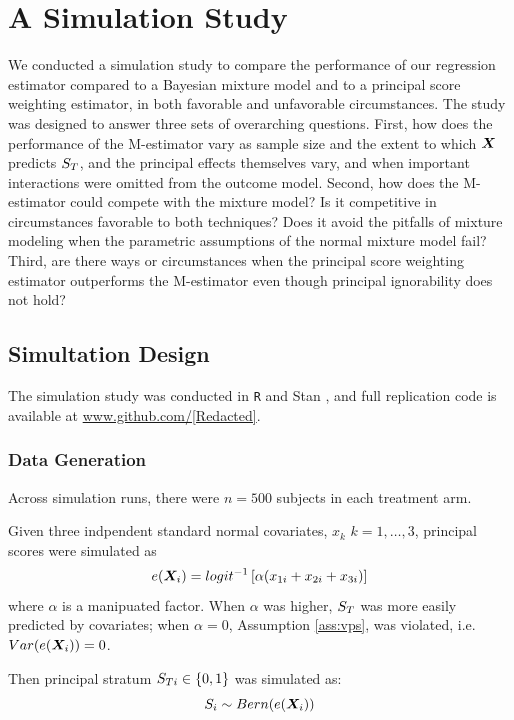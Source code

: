 \documentclass[11pt]{article} %
\begin{document}
\section{A Simulation Study}

We conducted a simulation study to compare the performance of our regression estimator compared to a Bayesian mixture model and to a principal score weighting estimator, in both favorable and unfavorable circumstances.
The study was designed to answer three sets of overarching questions.
First, how does the performance of the M-estimator vary as sample size and the extent to which $\bm{X}$ predicts $S_T$, and the principal effects themselves vary, and when important interactions were omitted from the outcome model.
Second, how does the M-estimator could compete with the mixture model? Is it competitive in circumstances favorable to both techniques? Does it avoid the pitfalls of mixture modeling when the parametric assumptions of the normal mixture model fail?
Third, are there ways or circumstances when the principal score weighting estimator outperforms the M-estimator even though principal ignorability does not hold?



\subsection{Simultation Design}
The simulation study was conducted in \texttt{R} \citep{rcite} and Stan \citep{rstan}, and full replication code is available at \url{www.github.com/[Redacted]}.
\subsubsection{Data Generation}

Across simulation runs, there were $n=500$ subjects in each treatment arm.

Given three indpendent standard normal covariates, $x_k$ $k=1,\dots,3$,
principal scores were simulated as
\begin{equation*}
  e(\bm{X}_i)=logit^{-1}\left[\alpha(x_{1i}+x_{2i}+x_{3i})\right]
\end{equation*}
where $\alpha$ is a manipuated factor.
When $\alpha$ was higher, $S_T$ was more easily predicted by covariates; when $\alpha=0$, Assumption \ref{ass:vps}, was violated, i.e. $Var(e(\bm{X}_i))=0$.

Then principal stratum $S_{Ti}\in \{0,1\}$ was simulated as:
\begin{equation*}
S_i\sim Bern(e(\bm{X}_i))
\end{equation*}
\end{document}
